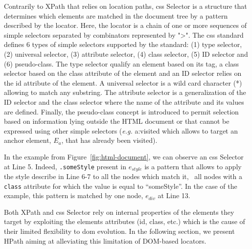 Contrarily to XPath that relies on location paths, \gls{css} Selector is a structure that determines which elements are matched in the document tree by a pattern described by the locator. Here, the locator is a chain of one or more sequences of simple selectors separated by combinators\cite{W3C2018} represented by ">". The \gls{css} standard defines 6 types of simple selectors supported by the standard: (1) type selector, (2) universal selector, (3) attribute selector, (4) class selector, (5) ID selector and (6) pseudo-class. The type selector qualify an element based on its tag, a class selector based on the class attribute of the element and an ID selector relies on the id attribute of the element. A universal selector is a wild card character (*) allowing to match any substring. The attribute selector is a generalization of the ID selector and the class selector where the name of the attribute and its values are defined. Finally, the pseudo-class concept is introduced to permit selection based on information lying outside the HTML document or that cannot be expressed using other simple selectors (\emph{e.g.} a:visited which allows to target an anchor element, $E_a$, that has already been visited).

In the example from Figure~\ref{fig:html-document}, we can observe an \gls{css} Selector at Line 5. Indeed, \texttt{.someStyle} present in $e_{style}$ is a pattern that allows to apply the style describe in Line 6-7 to all the nodes which match it, \ie\ all nodes with a \texttt{class} attribute for which the value is equal to ``someStyle''. In the case of the example, this pattern is matched by one node, $e_{div}$ at Line 13. 

Both XPath and \gls{css} Selector rely on internal properties of the elements they target by exploiting the elements attributes (id, class, etc.) which is the cause of their limited flexibility to \gls{dom} evolution. In the following section, we present HPath aiming at alleviating this limitation of DOM-based locators.